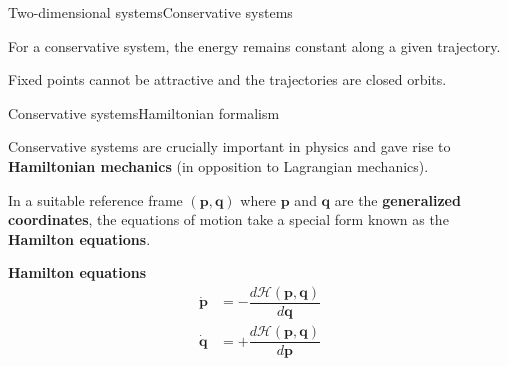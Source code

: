 \documentclass[usenames,dvipsnames,svgnames,10pt,aspectratio=169]{beamer}
\begin{document}
\begin{frame}[t, c]{Two-dimensional systems}{Conservative systems}
  \begin{minipage}{.48\textwidth}
    For a conservative system, the energy remains constant along a given trajectory.

    \bigskip

    Fixed points cannot be attractive and the trajectories are closed orbits.
  \end{minipage}%
  \hfill
  \begin{minipage}{.48\textwidth}
    \centering
  \end{minipage}

  \vspace{1cm}
\end{frame}

\begin{frame}[t, c]{Conservative systems}{Hamiltonian formalism}
  \begin{minipage}{.68\textwidth}
    Conservative systems are crucially important in physics and gave rise to \alert{\textbf{Hamiltonian mechanics}} (in opposition to Lagrangian mechanics).

    \bigskip

    In a suitable reference frame $(\bm{p}, \bm{q})$ where $\bm{p}$ and $\bm{q}$ are the \alert{\textbf{generalized coordinates}}, the equations of motion take a special form known as the \alert{\textbf{Hamilton equations}}.
  \end{minipage}%
  \hfill
  \begin{minipage}{.28\textwidth}
    \centering
    \textbf{Hamilton equations}
    \[
    \begin{aligned}
      \dot{\bm{p}} & = -\dfrac{d\mathcal{H}(\bm{p}, \bm{q})}{d\bm{q}} \\
      \dot{\bm{q}} & = +\dfrac{d\mathcal{H}(\bm{p}, \bm{q})}{d\bm{p}}
    \end{aligned}
    \]
  \end{minipage}

  \vspace{1cm}
\end{frame}
\end{document}
